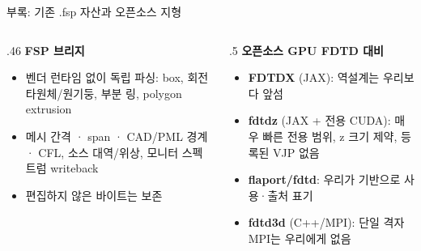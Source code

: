 \documentclass[aspectratio=169,11pt]{beamer}
\begin{document}
\begin{frame}{부록: 기존 .fsp 자산과 오픈소스 지형}
  \begin{columns}[T]
    \begin{column}{.46\textwidth}
      \footnotesize
      \textbf{FSP 브리지}
      \begin{itemize}\footnotesize
        \item 벤더 런타임 없이 독립 파싱: box, 회전 타원체/원기둥, 부분 링, polygon extrusion
        \item 메시 간격 · span · CAD/PML 경계 · CFL, 소스 대역/위상, 모니터 스펙트럼 writeback
        \item 편집하지 않은 바이트는 보존
      \end{itemize}
    \end{column}
    \begin{column}{.5\textwidth}
      \footnotesize
      \textbf{오픈소스 GPU FDTD 대비}
      \begin{itemize}\footnotesize
        \item \textbf{FDTDX} (JAX): 역설계는 \alert{우리보다 앞섬}
        \item \textbf{fdtdz} (JAX + 전용 CUDA): 매우 빠른 전용 범위, z 크기 제약, 등록된 VJP 없음
        \item \textbf{flaport/fdtd}: 우리가 기반으로 사용·출처 표기
        \item \textbf{fdtd3d} (C++/MPI): \alert{단일 격자 MPI는 우리에게 없음}
      \end{itemize}
    \end{column}
  \end{columns}
\end{frame}
\end{document}
